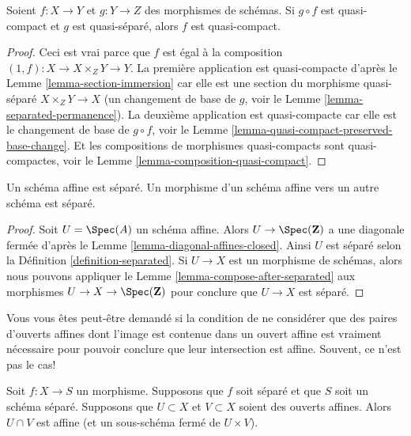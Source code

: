 \begin{lemma}
\label{lemma-quasi-compact-permanence}
Soient  $f : X \to Y$  et  $g : Y \to Z$  des morphismes de schémas. Si  $g \circ f$  est
quasi-compact et  $g$  est quasi-séparé, alors  $f$  est
quasi-compact.
\end{lemma}

\begin{proof}
Ceci est vrai parce que  $f$  est égal à la composition  $(1, f) : X \to X \times_Z Y \to Y$. La
première application est quasi-compacte d'après le Lemme  \ref{lemma-section-immersion}  car elle est
une section du morphisme quasi-séparé  $X \times_Z Y \to X$  (un changement de base de
 $g$, voir le Lemme  \ref{lemma-separated-permanence}). La deuxième application est
quasi-compacte car elle est le changement de base de  $g \circ f$, voir le Lemme
 \ref{lemma-quasi-compact-preserved-base-change}. Et les compositions de morphismes quasi-compacts sont
quasi-compactes, voir le Lemme  \ref{lemma-composition-quasi-compact}.
\end{proof}

\begin{lemma}
\label{lemma-affine-separated}
Un schéma affine est séparé. Un morphisme d'un schéma affine vers un autre schéma
est séparé.
\end{lemma}

\begin{proof}
Soit  $U = \Spec(A)$  un schéma affine. Alors  $U \to \Spec(\mathbf{Z})$  a une diagonale fermée
d'après le Lemme  \ref{lemma-diagonal-affines-closed}. Ainsi  $U$  est séparé selon la Définition
 \ref{definition-separated}. Si  $U \to X$  est un morphisme de schémas, alors nous pouvons
appliquer le Lemme  \ref{lemma-compose-after-separated}  aux morphismes  $U \to X \to \Spec(\mathbf{Z})$  pour conclure que
 $U \to X$  est séparé.
\end{proof}

\noindent
Vous vous êtes peut-être demandé si la condition de ne considérer que des paires
d'ouverts affines dont l'image est contenue dans un ouvert affine est vraiment
nécessaire pour pouvoir conclure que leur intersection est affine. Souvent, ce
n'est pas le cas!

\begin{lemma}
\label{lemma-curiosity}
Soit  $f : X \to S$  un morphisme. Supposons que  $f$  soit séparé et que
 $S$  soit un schéma séparé. Supposons que  $U \subset X$  et  $V \subset X$ 
soient des ouverts affines. Alors  $U \cap V$  est affine (et un sous-schéma fermé
de  $U \times V$).
\end{lemma}


